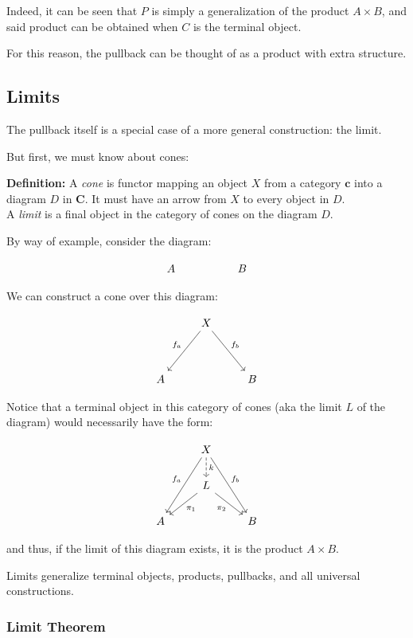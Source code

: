 \documentclass[]{article}
\newcommand{\what}{}
\newcommand{\cat}[1]{\mathbf{#1}}
\newcommand{\defn}[2]{
\renewcommand{\what}{\textit{#1} }
\textbf{Definition:} #2\\
}
\begin{document}
Indeed, it can be seen that $P$ is simply a generalization of the product $A \times B$, and said product can be obtained
when $C$ is the terminal object.

For this reason, the pullback can be thought of as a product with extra structure.

\subsection{Limits}

The pullback itself is a special case of a more general construction: the limit.

But first, we must know about cones:

\defn{cone}{A \what is functor mapping an object $X$ from a category $\cat{c}$ into a diagram $D$ in $\cat{C}$. It must
have an arrow from $X$ to every object in $D$.}

A \textit{limit} is a final object in the category of cones on the diagram $D$.

By way of example, consider the diagram:

$$\begin{tikzcd}
A & & B
\end{tikzcd}$$

We can construct a cone over this diagram:

$$\begin{tikzcd}
{} & X \arrow[swap]{ddl}{f_a} \arrow{ddr}{f_b} & \\
  & & \\
A & & B
\end{tikzcd}$$

Notice that a terminal object in this category of cones (aka the limit $L$ of the diagram) would necessarily have the
form:

$$\begin{tikzcd}
{} & X \arrow[swap]{ddl}{f_a} \arrow{ddr}{f_b} \arrow[dashed]{d}{k} & \\
  & L \arrow{dl}{\pi_1} \arrow[swap]{dr}{\pi_2} & \\
A & & B
\end{tikzcd}$$

and thus, if the limit of this diagram exists, it is the product $A\times B$.

Limits generalize terminal objects, products, pullbacks, and all universal constructions.

\subsubsection{Limit Theorem}
\end{document}
